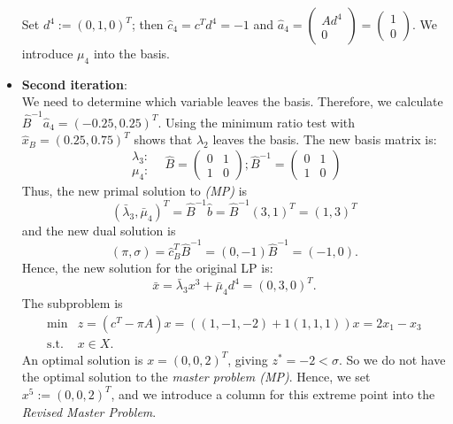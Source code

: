 \begin{itemize}
     Set $d^4:=(0,1,0)^T$; then $\hat{c}_4=c^Td^4=-1$ and
      $\hat{a}_4=\left(\begin{array}{c}Ad^4\\0\end{array}\right)=
         \left(\begin{array}{c}1\\0\end{array}\right)$.
     We introduce $\mu_4$ into the basis.

\newpage
  \item {\bf Second iteration}: \\
     We need to determine which variable leaves the basis.
     Therefore, we calculate $\hat{B}^{-1}\hat{a}_4=(-0.25,0.25)^T$.
     Using the minimum ratio test with $\hat{x}_B=(0.25,0.75)^T$ shows that
     $\lambda_2$ leaves the basis.
     The new basis matrix is:
     \begin{displaymath}
       \begin{array}{c}\lambda_3: \\ \mu_4: \end{array} \;\;\;
       \hat{B} = \left(\begin{array}{rr}0&1\\1&0\end{array}\right);
        \hat{B}^{-1} = \left(\begin{array}{rr}0&1\\1&0\end{array}\right)
     \end{displaymath}
     Thus, the new primal solution to {\em (MP)} is
     \begin{displaymath}
      (\bar{\lambda}_3,\bar{\mu}_4)^T =
       \hat{B}^{-1} \hat{b} = \hat{B}^{-1} (3,1)^T = (1,3)^T
     \end{displaymath}
     and the new dual solution is
     \begin{displaymath}
       (\pi,\sigma) = \hat{c}^T_B \hat{B}^{-1} = (0,-1) \hat{B}^{-1} = (-1,0).
     \end{displaymath}
     Hence, the new solution for the original LP is:
     \begin{displaymath}
       \bar{x} = \bar{\lambda}_3 x^3 + \bar{\mu}_4 d^4 = (0,3,0)^T.
     \end{displaymath}
     The subproblem is
     \begin{displaymath}
       \begin{array}{lc}
       \min & z = (c^T - \pi A) x = ((1,-1,-2)+1(1,1,1))x=2x_1-x_3 \\
          \mbox{s.t. }  & x \in X.
       \end{array}
     \end{displaymath}
     An optimal solution is $x=(0,0,2)^T$, giving $z^*=-2<\sigma$.
     So we do not have the optimal solution to the {\em master problem (MP)}.
     Hence, we set $x^5:=(0,0,2)^T$, and we introduce a column for this extreme
     point into the {\em Revised Master Problem}.


\end{itemize}
